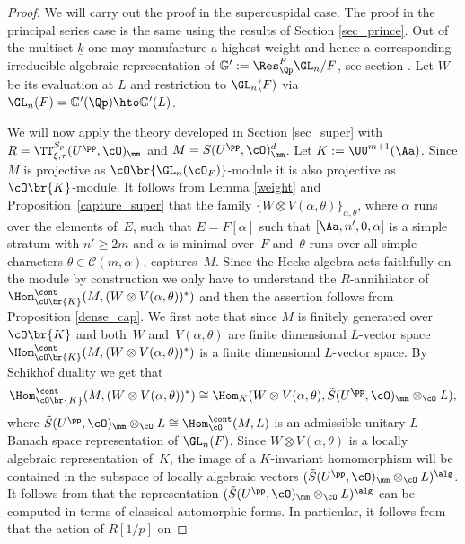 \begin{proof} We will carry out the proof in the supercuspidal case. The proof in the principal series case is the same using the results of Section \ref{sec_prince}. Out of the multiset $\underline{k}$ one may manufacture a highest weight and hence a corresponding irreducible algebraic representation
of $\mathbb G':=\Res^F_{\Qp} \GL_n/F$, see section \cite[\S 1.8]{six-authors}. Let $W$ be its evaluation at $L$ and restriction to $\GL_n(F)$ via
$\GL_n(F)=\mathbb{G}'(\Qp)\hto \mathbb{G}'(L)$.

We will now apply the theory developed in Section \ref{sec_super} with
$R= \TT^{S_p}_{\xi, \tau}(U^{\pp}, \cO)_{\mm}$ and
$M= S(U^\pp, \cO)_{\mm}^d$. Let $K:=\UU^{m+1}(\Aa)$.
Since $M$ is projective as $\cO\br{\GL_n(\cO_F)}$-module
it is also projective as $\cO\br{K}$-module.
It follows from Lemma \ref{weight} and Proposition~\ref{capture_super} that the family $\{W\otimes V(\alpha, \theta)\}_{\alpha, \theta}$, where $\alpha$ runs over the elements of~$E$, such that
$E=F[\alpha]$ such that $[\Aa, n', 0, \alpha]$ is a simple stratum with $n'\ge 2m$ and $\alpha$ is minimal over~$F$ and~$\theta$ runs over all simple characters
$\theta\in \mathcal C(m, \alpha)$, captures~$M$.
Since the Hecke algebra acts faithfully on the module by construction
we only have to understand the
$R$-annihilator of $\Hom^{\cont}_{\cO\br{K}}(M, (W\otimes V(\alpha, \theta))^*)$ and then the assertion follows from Proposition \ref{dense_cap}. We first note that
since $M$ is finitely generated over $\cO\br{K}$ and both~$W$ and~$V(\alpha, \theta)$ are finite dimensional $L$-vector space \hbox{$\Hom^{\cont}_{\cO\br{K}}(M, (W\otimes V(\alpha, \theta))^*)$} is a finite dimensional $L$-vector space. By Schikhof
duality we get that
\[
\Hom^{\cont}_{\cO\br{K}}(M, (W\otimes V(\alpha, \theta))^*)\cong
\Hom_K(W\otimes V(\alpha, \theta), \tilde{S}(U^{\pp}, \cO)_{\mm}\otimes_{\cO} L),
\]
where $\tilde{S}(U^{\pp}, \cO)_{\mm}\otimes_{\cO} L\cong \Hom^{\cont}_{\cO} (M, L)$ is an admissible unitary $L$-Banach space representation of $\GL_n(F)$. Since
$W\otimes V(\alpha, \theta)$ is a locally algebraic representation of~$K$, the image of a $K$-invariant homomorphism will be contained in the subspace of locally algebraic vectors $(\tilde{S}(U^{\pp}, \cO)_{\mm}\otimes_{\cO} L)^\alg$. It follows from \cite[Prop.\,3.2.4]{em0} that the representation $(\tilde{S}(U^{\pp}, \cO)_{\mm}\otimes_{\cO} L)^\alg$ can be computed in terms of classical automorphic forms.
In particular, it follows from \cite[Prop.\,6.11]{gross} that the action of
$R[1/p]$ on

\end{proof}
